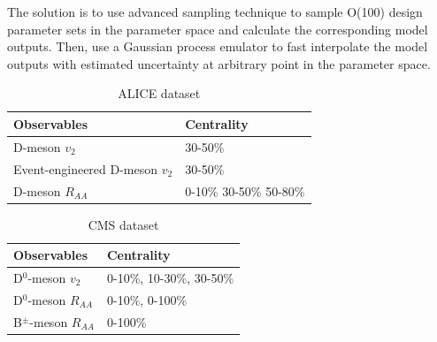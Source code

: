 \documentclass[aps, prc, reprint, amsmath, groupedaddress, nofootinbib]{revtex4-1}
\begin{document}
The solution is to use advanced sampling technique to sample O(100) design parameter sets in the parameter space and calculate the corresponding model outputs.
Then, use a Gaussian process emulator to fast interpolate the model outputs with estimated uncertainty at arbitrary point in the parameter space.
\begin{center}
\begin{table}[h]
\caption{ALICE dataset}\label{table:ALICE-obs} 
\begin{tabularx}{\columnwidth}{Xl}
\hline 
 Observables & Centrality \\ 
\hline 
D-meson $v_2$ & 30-50\% \\ 
Event-engineered D-meson $v_2$ & 30-50\% \\ 
D-meson $R_{AA}$ & 0-10\% 30-50\% 50-80\% \\
\hline 
\end{tabularx}
\end{table}
\begin{table}[h]
\caption{CMS dataset}\label{table:CMS-obs} 
\begin{tabularx}{\columnwidth}{Xl}
\hline 
Observables & Centrality \\ 
\hline 
D${}^0$-meson $v_2$ & 0-10\%, 10-30\%, 30-50\% \\ 
D${}^0$-meson $R_{AA}$ & 0-10\%, 0-100\% \\ 
B${}^{\pm}$-meson $R_{AA}$ & 0-100\% \\ 
\hline 
\end{tabularx}
\end{table}
\end{center}
\end{document}
